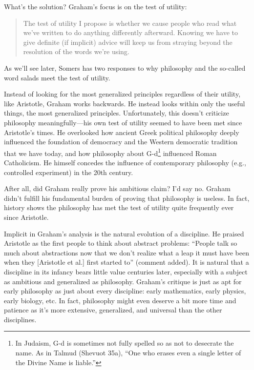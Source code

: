 \documentclass[12pt]{article}
\begin{document}
What's the solution? Graham's focus is on the test of utility:

\begin{quotation}
 The test of utility I propose is whether we cause people who read what we've written to do anything differently afterward. Knowing we have to give definite (if implicit) advice will keep us from straying beyond the resolution of the words we're using.
\end{quotation}

As we'll see later, Somers has two responses to why philosophy and the so-called word salads meet the test of utility.

Instead of looking for the most generalized principles regardless of their utility, like Aristotle, Graham works backwards. He instead looks within only the useful things, the most generalized principles. Unfortunately, this doesn't criticize philosophy meaningfully---his own test of utility seemed to have been met since Aristotle's times. He overlooked how ancient Greek political philosophy deeply influenced the foundation of democracy and the Western democratic tradition that we have today, and how philosophy about G-d\footnote{In Judaism, G-d is sometimes not fully spelled so as not to desecrate the name. As in Talmud (Shevuot 35a), \enquote{One who erases even a single letter of the Divine Name is liable.}} influenced Roman Catholicism. He himself concedes the influence of contemporary philosophy (e.g., controlled experiment) in the 20th century.

After all, did Graham really prove his ambitious claim? I'd say no. Graham didn't fulfill his fundamental burden of proving that philosophy is useless. In fact, history shows the philosophy has met the test of utility quite frequently ever since Aristotle.

Implicit in Graham's analysis is the natural evolution of a discipline. He praised Aristotle as the first people to think about abstract problems: \enquote{People talk so much about abstractions now that we don't realize what a leap it must have been when they [Aristotle et al.] first started to} (comment added). It is natural that a discipline in its infancy bears little value centuries later, especially with a subject as ambitious and generalized as philosophy. Graham's critique is just as apt for early philosophy as just about every discipline: early mathematics, early physics, early biology, etc. In fact, philosophy might even deserve a bit more time and patience as it's more extensive, generalized, and universal than the other disciplines.
\end{document}
